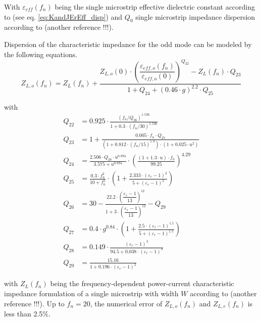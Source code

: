 \documentclass[10pt]{report}
\begin{document}
With $\varepsilon_{eff}(f_n)$ being the single microstrip effective
dielectric constant according to \cite{Kirschning3} (see eq.
\eqref{eq:KandJErEff_disp}) and $Q_0$ single microstrip impedance
dispersion according to (another reference !!!).

\addvspace{12pt}

Dispersion of the characteristic impedance for the odd mode can be
modeled by the following equations.
\begin{equation}
Z_{L,o}(f_n) = Z_L(f_n) + \dfrac{ Z_{L,o}(0)\cdot
               \left( \dfrac{\varepsilon_{eff,o}(f_n)}{\varepsilon_{eff,o}(0)} \right) ^{Q_{22}}
	     - Z_L(f_n)\cdot Q_{23} }{ 1+Q_{24}+\left(0.46\cdot g\right)^{2.2} \cdot Q_{25} }
\end{equation}

with
\begin{align}
Q_{22} &= 0.925\cdot \frac{ \left( f_n/Q_{26} \right) ^{1.536} }
                         { 1+0.3\cdot \left( f_n/30 \right)^{1.536} }\\
Q_{23} &= 1+ \frac{ 0.005\cdot f_n\cdot Q_{27} }
                 { \left( 1+0.812\cdot\left( f_n/15 \right) ^{1.9} \right) \cdot
		   \left(1 + 0.025\cdot u^2\right) }\\
Q_{24} &= \frac{2.506\cdot Q_{28}\cdot u^{0.894}}{3.575+u^{0.894}} \cdot
         \left( \frac{ (1+1.3\cdot u)\cdot f_n}{99.25} \right)^{4.29}\\
Q_{25} &= \frac{0.3\cdot f_n^2}{10+f_n^2}\cdot
         \left( 1+ \frac{2.333\cdot \left(\varepsilon_r-1\right)^2}{5+\left(\varepsilon_r-1\right)^2} \right)\\
Q_{26} &= 30 - \frac{ 22.2\cdot \left( \dfrac{\varepsilon_r-1}{13} \right)^{12} }
                   { 1+ 3\cdot \left( \dfrac{\varepsilon_r-1}{13} \right)^{12} } - Q_{29}\\
Q_{27} &= 0.4\cdot g^{0.84}\cdot \left( 1+
         \frac{2.5\cdot \left(\varepsilon_r-1\right)^{1.5}}{5+\left(\varepsilon_r-1\right)^{1.5}} \right)\\
Q_{28} &= 0.149\cdot \frac{\left(\varepsilon_r-1\right)^3}{94.5+0.038\cdot \left(\varepsilon_r-1\right)^3}\\
Q_{29} &= \frac{15.16}{1+0.196\cdot \left(\varepsilon_r-1\right)^2}
\end{align}

with $Z_L(f_n)$ being the frequency-dependent power-current
characteristic impedance formulation of a single microstrip with width
$W$ according to (another reference !!!).  Up to $f_n=20$, the numerical
error of $Z_{L,o}(f_n)$ and $Z_{L,e}(f_n)$ is less than 2.5\%.
\end{document}

